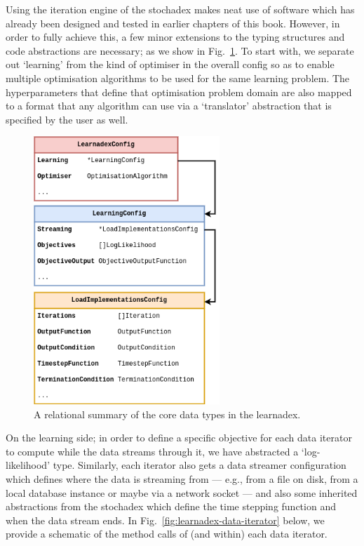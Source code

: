 Using the iteration engine of the stochadex makes neat use of software which has already been designed and tested in earlier chapters of this book. However, in order to fully achieve this, a few minor extensions to the typing structures and code abstractions are necessary; as we show in Fig.~\ref{fig:learnadex-data-types-design}. To start with, we separate out `learning' from the kind of optimiser in the overall config so as to enable multiple optimisation algorithms to be used for the same learning problem. The hyperparameters that define that optimisation problem domain are also mapped to a format that any algorithm can use via a `translator' abstraction that is specified by the user as well.

\begin{figure}[h]
\centering
\includegraphics[width=7cm]{images/chapter-4-learnadex-data-types.drawio.png}
\caption{A relational summary of the core data types in the learnadex.}
\label{fig:learnadex-data-types-design}
\end{figure}

On the learning side; in order to define a specific objective for each data iterator to compute while the data streams through it, we have abstracted a `log-likelihood' type. Similarly, each iterator also gets a data streamer configuration which defines where the data is streaming from --- e.g., from a file on disk, from a local database instance or maybe via a network socket --- and also some inherited abstractions from the stochadex which define the time stepping function and when the data stream ends. In Fig.~\ref{fig:learnadex-data-iterator} below, we provide a schematic of the method calls of (and within) each data iterator.

